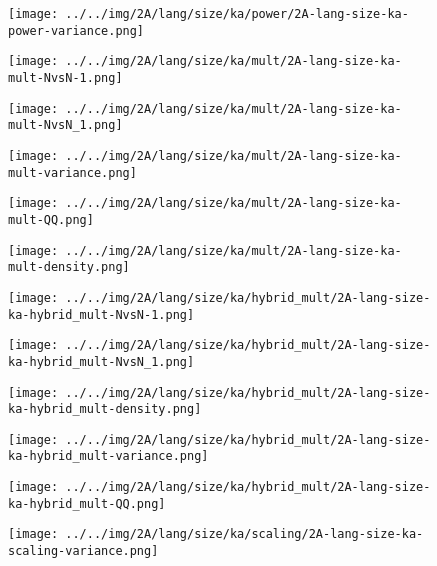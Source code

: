 \begin{figure}[H]
\centering	\texttt{[image: ../../img/2A/lang/size/ka/power/2A-lang-size-ka-power-variance.png]}
\end{figure}
\begin{figure}[H]
\centering	\texttt{[image: ../../img/2A/lang/size/ka/mult/2A-lang-size-ka-mult-NvsN-1.png]}
\end{figure}
\begin{figure}[H]
\centering	\texttt{[image: ../../img/2A/lang/size/ka/mult/2A-lang-size-ka-mult-NvsN\_1.png]}
\end{figure}
\begin{figure}[H]
\centering	\texttt{[image: ../../img/2A/lang/size/ka/mult/2A-lang-size-ka-mult-variance.png]}
\end{figure}
\begin{figure}[H]
\centering	\texttt{[image: ../../img/2A/lang/size/ka/mult/2A-lang-size-ka-mult-QQ.png]}
\end{figure}
\begin{figure}[H]
\centering	\texttt{[image: ../../img/2A/lang/size/ka/mult/2A-lang-size-ka-mult-density.png]}
\end{figure}
\begin{figure}[H]
\centering	\texttt{[image: ../../img/2A/lang/size/ka/hybrid\_mult/2A-lang-size-ka-hybrid\_mult-NvsN-1.png]}
\end{figure}
\begin{figure}[H]
\centering	\texttt{[image: ../../img/2A/lang/size/ka/hybrid\_mult/2A-lang-size-ka-hybrid\_mult-NvsN\_1.png]}
\end{figure}
\begin{figure}[H]
\centering	\texttt{[image: ../../img/2A/lang/size/ka/hybrid\_mult/2A-lang-size-ka-hybrid\_mult-density.png]}
\end{figure}
\begin{figure}[H]
\centering	\texttt{[image: ../../img/2A/lang/size/ka/hybrid\_mult/2A-lang-size-ka-hybrid\_mult-variance.png]}
\end{figure}
\begin{figure}[H]
\centering	\texttt{[image: ../../img/2A/lang/size/ka/hybrid\_mult/2A-lang-size-ka-hybrid\_mult-QQ.png]}
\end{figure}
\begin{figure}[H]
\centering	\texttt{[image: ../../img/2A/lang/size/ka/scaling/2A-lang-size-ka-scaling-variance.png]}
\end{figure}
